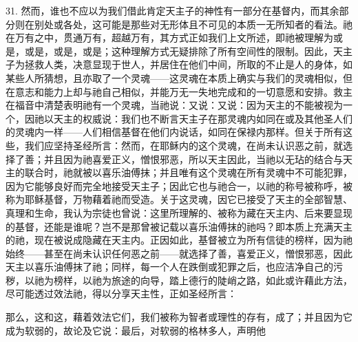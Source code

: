 31. 然而，谁也不应以为我们借此肯定天主子的神性有一部分在基督内，而其余部分则在别处或各处，这可能是那些对无形体且不可见的本质一无所知者的看法。祂在万有之中，贯通万有，超越万有，其方式正如我们上文所述，即祂被理解为或是，或是，或是，或是；这种理解方式无疑排除了所有空间性的限制。因此，天主子为拯救人类，决意显现于世人，并居住在他们中间，所取的不止是人的身体，如某些人所猜想，且亦取了一个灵魂——这灵魂在本质上确实与我们的灵魂相似，但在意志和能力上却与祂自己相似，并能万无一失地完成和的一切意愿和安排。救主在福音中清楚表明祂有一个灵魂，当祂说：又说：又说：因为天主的不能被视为一个，因祂以天主的权威说：我们也不断言天主子在那灵魂内如同在或及其他圣人们的灵魂内一样——人们相信基督在他们内说话，如同在保禄内那样。但关于所有这些，我们应坚持圣经所言：然而，在耶稣内的这个灵魂，在尚未认识恶之前，就选择了善；并且因为祂喜爱正义，憎恨邪恶，所以天主因此，当祂以无玷的结合与天主的联合时，祂就被以喜乐油傅抹；并且唯有这个灵魂在所有灵魂中不可能犯罪，因为它能够良好而完全地接受天主子；因此它也与祂合一，以祂的称号被称呼，被称为耶稣基督，万物藉着祂而受造。关于这灵魂，因它已接受了天主的全部智慧、真理和生命，我认为宗徒也曾说：这里所理解的、被称为藏在天主内、后来要显现的基督，还能是谁呢？岂不是那曾被记载以喜乐油傅抹的祂吗？即本质上充满天主的祂，现在被说成隐藏在天主内。正因如此，基督被立为所有信徒的榜样，因为祂始终——甚至在尚未认识任何恶之前——就选择了善，喜爱正义，憎恨邪恶，因此天主以喜乐油傅抹了祂；同样，每一个人在跌倒或犯罪之后，也应洁净自己的污秽，以祂为榜样，以祂为旅途的向导，踏上德行的陡峭之路，如此或许藉此方法，尽可能透过效法祂，得以分享天主性，正如圣经所言：\par

那么，这和这，藉着效法它们，我们被称为智者或理性的存有，成了；并且因为它成为软弱的，故论及它说：最后，对软弱的格林多人，声明他\par

